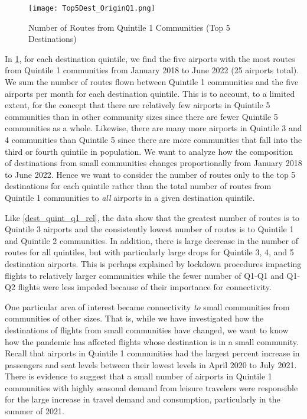 \documentclass[11pt]{article}
\begin{document}
\begin{figure}[htbp!]
\centerline{\texttt{[image: Top5Dest\_OriginQ1.png]}}
\caption{Number of Routes from Quintile 1 Communities (Top 5 Destinations)}
\label{Top5Dest_OriginQ1}
\end{figure}

In \cref{Top5Dest_OriginQ1}, for each destination quintile, we find the five airports with the most routes from Quintile 1 communities from January 2018 to June 2022 (25 airports total). We sum the number of routes flown between Quintile 1 communities and the five airports per month for each destination quintile. This is to account, to a limited extent, for the concept that there are relatively few airports in Quintile 5 communities than in other community sizes since there are fewer Quintile 5 communities as a whole. Likewise, there are many more airports in Quintile 3 and 4 communities than Quintile 5 since there are more communities that fall into the third or fourth quintile in population. We want to analyze how the composition of destinations from small communities changes proportionally from January 2018 to June 2022. Hence we want to consider the number of routes only to the top 5 destinations for each quintile rather than the total number of routes from Quintile 1 communities to \textit{all} airports in a given destination quintile.

\-\hspace{0.5cm} Like \cref{dest_quint_q1_rel}, the data show that the greatest number of routes is to Quintile 3 airports and the consistently lowest number of routes is to Quintile 1 and Quintile 2 communities. In addition, there is large decrease in the number of routes for all quintiles, but with particularly large drops for Quintile 3, 4, and 5 destination airports. This is perhaps explained by lockdown procedures impacting flights to relatively larger communities while the fewer number of Q1-Q1 and Q1-Q2 flights were less impeded because of their importance for connectivity.

\-\hspace{0.5cm} One particular area of interest became connectivity \textit{to} small communities from communities of other sizes. That is, while we have investigated how the destinations of flights from small communities have changed, we want to know how the pandemic has affected flights whose destination is in a small community. Recall that airports in Quintile 1 communities had the largest percent increase in passengers and seat levels between their lowest levels in April 2020 to July 2021. There is evidence to suggest that a small number of airports in Quintile 1 communities with highly seasonal demand from leisure travelers were responsible for the large increase in travel demand and consumption, particularly in the summer of 2021. 
\end{document}
